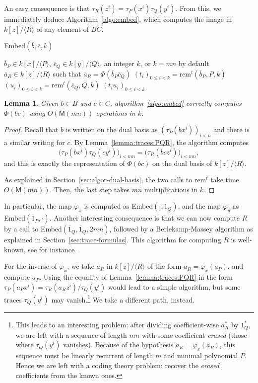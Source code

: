 \documentclass[12pt]{article}
\def\M {\ensuremath{\mathsf{M}}}
\def\rem {\ensuremath{\mathrm{rem}}}
\newcommand{\ang}[1]{\langle#1\rangle}
\newcommand{\dual}[1]{\overline{#1}}
\newtheorem{Lemma}{Lemma}
\begin{document}
An easy consequence is that $\tau_R(z^i) =
\tau_P(x^i)\tau_Q(y^i)$. From this, we immediately deduce
Algorithm~\ref{algo:embed}, which computes the image in $k[z]/\ang{R}$
of any element of $BC$.

\begin{algorithm}[H]
  \caption{Embed$(\dual{b},\dual{c},k)$}
  \begin{algorithmic}[1]
    \REQUIRE $\dual{b}_P\in k[x]/\ang{P}$, $\dual{c}_Q\in k[y]/\ang{Q}$, an integer $k$, or $k=mn$ by default
    \ENSURE $\dual{a}_R\in k[z]/\ang{R}$ such that $\dual{a}_R=\Phi(\dual{b}_P \dual{c}_Q)$
    \STATE $(t_i)_{0\le i<k} = \rem^t(\dual{b}_P,P,k)$
    \STATE $(u_i)_{0\le i<k} = \rem^t(\dual{c}_Q,Q,k)$
    \RETURN $(t_i u_i)_{0 \le i < k}$
  \end{algorithmic}
  \label{algo:embed}
\end{algorithm}

\begin{Lemma}\label{lemma:algo:embed}
  Given $\dual{b}\in B$ and $\dual{c}\in C$, algorithm~\ref{algo:embed} correctly
  computes $\dual{\Phi(b c)}$ using $O(\M(mn))$ operations in $k$.
\end{Lemma}
\begin{proof}
  Recall that $b$ is written on the dual basis as
  $(\tau_P(bx^i))_{i<n}$ and there is a similar writing for $c$. By
  Lemma~\ref{lemma:traces:PQR}, the algorithm
  computes $$\bigl(\tau_P(bx^i)\tau_Q(cy^i)\bigr)_{i<mn} =
  \bigl(\tau_R(bcz^i)\bigr)_{i<mn},$$ and this is exactly the
  representation of $\Phi(bc)$ on the dual basis of $k[z]/\ang{R}$.

  As explained in Section~\ref{sec:algor-dual-basis}, the two calls to
  $\rem^t$ take time $O(\M(mn))$. Then, the last step takes $mn$
  multiplications in $k$.
\end{proof}

In particular, the map $\varphi_x$ is computed as
Embed$(\cdot,\dual{1}_Q)$, and the map $\varphi_y$ as
Embed$(\dual{1}_P,\cdot)$. Another interesting consequence is that we
can now compute $R$ by a call to Embed$(\dual{1}_Q,\dual{1}_Q,2mn)$,
followed by a Berlekamp-Massey algorithm as explained in
Section~\ref{sec:trace-formulas}. This algorithm for computing $R$ is
well-known, see for instance~\cite{BoFlSaSc06}.


For the inverse of $\varphi_x$, we take $a_R$ in $k[z]/\langle R
\rangle$ of the form $a_R=\varphi_x(a_P)$, and compute $a_P$. Using
the equality of Lemma~\ref{lemma:traces:PQR} in the form $\tau_P(a_P
x^i) =\tau_R(a_R z^i)/\tau_Q(y^i)$ would lead to a simple algorithm,
but some traces $\tau_Q(y^i)$ may vanish.\footnote{This leads to an
  interesting problem: after dividing coefficient-wise $a_R^\ast$ by
  $1_Q^\ast$, we are left with a sequence of length $mn$ with some
  coefficient \emph{erased} (those where $\tau_Q(y^i)$
  vanishes). Because of the hypothesis $a_R=\varphi_x(a_P)$, this
  sequence must be linearly recurrent of length $m$ and minimal
  polynomial $P$. Hence we are left with a coding theory problem:
  recover the \emph{erased} coefficients from the known ones.}  We
take a different path, instead.
\end{document}

